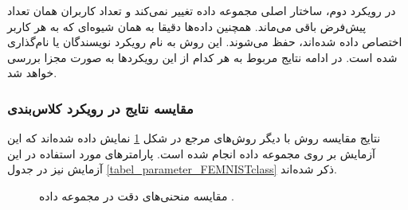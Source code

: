 در رویکرد دوم، ساختار اصلی مجموعه داده تغییر نمی‌کند و تعداد کاربران همان تعداد پیش‌فرض باقی می‌ماند. همچنین داده‌ها دقیقا به همان شیوه‌ای که به هر کاربر اختصاص داده شده‌اند، حفظ می‌شوند. این روش به نام رویکرد نویسندگان یا
نام‌گذاری شده است. در ادامه نتایج مربوط به هر کدام از این رویکرد‌ها به صورت مجزا بررسی خواهد شد.


\vspace{3mm}
\subsubsection{
	مقایسه نتایج در رویکرد کلاس‌بندی
}\vspace{-1mm}

نتایج مقایسه روش
با دیگر روش‌های مرجع در شکل
\ref{result_FEMNISTclass}
نمایش داده شده‌اند که این آزمایش بر روی مجموعه داده
انجام شده است. پارامترهای مورد استفاده در این آزمایش نیز در جدول
\ref{tabel_parameter_FEMNISTclass}
ذکر شده‌اند.


\begin{figure}[h]
	\centering
	\hspace{0.8mm}
	\caption{
		مقایسه منحنی‌های دقت در مجموعه داده
		.
	}
	\label{result_FEMNISTclass}
\end{figure}


